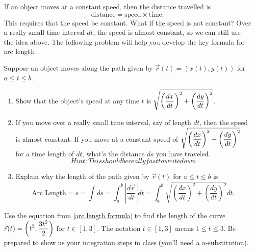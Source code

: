 If an object moves at a constant speed, then the distance travelled is 
$$\text{distance} = \text{speed}\times\text{time}.$$
This requires that the speed be constant.  What if the speed is not constant? Over a really small time interval $dt$, the speed is almost constant, so we can still use the idea above. The following problem will help you develop the key formula for arc length.

\begin{problem} 
Suppose an object moves along the path given by $\vec r(t)=(x(t),y(t))$ for $a\leq t\leq b$. 
\begin{enumerate}
\item Show that the object's speed at any time $t$ is 
$\displaystyle\sqrt{\left(\frac{dx}{dt}\right)^2+\left(\frac{dy}{dt}\right)^2}$.
\item If you move over a really small time interval, say of length $dt$, then the speed is almost constant. If you move at a constant speed of $\displaystyle\sqrt{\left(\frac{dx}{dt}\right)^2+\left(\frac{dy}{dt}\right)^2}$ for a time length of $dt$, what's the distance $ds$ you have traveled.\\
\[Hint: This should be really fast to write down\] 
\item  Explain why the length of the path given by $\vec r(t)$ for $a\leq t\leq b$ is  
$$\text{Arc Length}=s=\int ds=\int_a^b \left|\frac{d\vec r}{dt}\right| dt=\int_a^b \sqrt{\left(\frac{dx}{dt}\right)^2+\left(\frac{dy}{dt}\right)^2}dt.$$\label{arc length formula}
\end{enumerate}
\end{problem}

\begin{problem} 
Use the equation from \ref{arc length formula} to find the length of the curve  $\displaystyle \vec r(t) = \left(t^3,\frac{3t^2}{2}\right)$ for $t\in[1,3]$. The notation $t\in[1,3]$ means $1\leq t\leq 3$. Be prepared to show us your integration steps in class (you'll need a $u$-substitution).
\end{problem}

